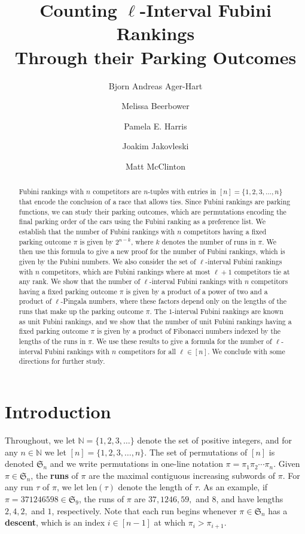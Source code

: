\documentclass{amsart}
\title{Counting $\ell$-Interval Fubini Rankings\\Through their Parking Outcomes}
\author[Ager-Hart]{Bjorn Andreas Ager-Hart}
\author[Beerbower]{Melissa Beerbower}
\author[Harris]{Pamela E. Harris}
\author[Jakovleski]{Joakim Jakovleski}
\author[McClinton]{Matt McClinton}
\newcommand{\defterm}{\textbf}
\theoremstyle{definition}
\theoremstyle{definition}
\theoremstyle{remark}
\newcommand{\NN}{\mathbb{N}}
\newcommand{\len}{\mathrm{len}}
\newcommand{\Sym}{\mathfrak{S}}
\begin{document}
\begin{abstract}
    Fubini rankings with $n$ competitors are $n$-tuples with entries in $[n]=\{1,2,3,\ldots, n\}$ that encode the conclusion of a race that allows ties. 
    Since Fubini rankings are parking functions, we can  study their parking outcomes, which are permutations encoding the final parking order of the cars using the Fubini ranking as a preference list. 
    We establish that the number of Fubini rankings with $n$ competitors having a fixed parking outcome $\pi$ is given by $2^{n-k}$, where $k$ denotes the number of runs in $\pi$. 
    We then use this formula to give a new proof for the number of Fubini rankings, which is given by the Fubini numbers. 
    We also consider the set of $\ell$-interval Fubini rankings with $n$ competitors, which are Fubini rankings where at most $\ell+1$ competitors tie at any rank. 
    We show that the number of $\ell$-interval Fubini rankings with $n$ competitors having a fixed parking outcome $\pi$ is given by a product of a power of two and a product of $\ell$-Pingala numbers, where these factors depend only on the lengths of the runs that make up the parking outcome $\pi$.
    The $1$-interval Fubini rankings are known as unit Fubini rankings, and we show that the number of unit Fubini rankings having a fixed parking outcome $\pi$ is given by a product of Fibonacci numbers indexed by the lengths of the runs in $\pi$. 
    We use these results to give a formula for the number of $\ell$-interval Fubini rankings with $n$ competitors for all $\ell\in[n]$. 
    We conclude with some directions for further study.
\end{abstract}
\maketitle

\section{Introduction}
Throughout, we let $\NN=\{1,2,3,\ldots\}$ denote the set of positive integers, and for any $n\in \NN$ we let $[n]=\{1,2,3,\ldots,n\}$. The set of permutations of $[n]$ is denoted $\mathfrak{S}_n$ and we write permutations in one-line notation $\pi=\pi_1\pi_2\cdots\pi_n$. Given $\pi\in\mathfrak{S}_n$, the \defterm{runs} of $\pi$ are the maximal contiguous increasing subwords of $\pi$. For any run $\tau$ of $\pi$, we let $\len(\tau)$ denote the length of $\tau$. 
As an example, if $\pi=371246598\in\mathfrak{S}_9$, the runs of $\pi$ are $37,1246,59,$ and $8$, and have lengths $2,4,2,$ and $1$, respectively. 
Note that each run begins whenever $\pi\in\Sym_n$ has a \defterm{descent}, which is an index $i\in[n-1]$ at which $\pi_i>\pi_{i+1}$.
\end{document}
